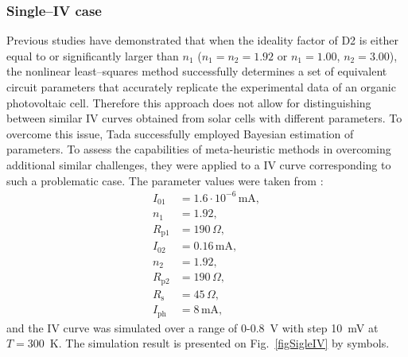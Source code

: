\documentclass[a4paper,fleqn]{cas-dc}
\begin{document}
\subsubsection{Single--IV case}\label{SingleIV}

Previous studies have demonstrated \cite{Tada2015Organic,Tada2021} that when the ideality factor of D2 is either equal to or significantly larger than $n_1$
($n_1=n_2=1.92$ or $n_1=1.00$, $n_2=3.00$), the nonlinear least--squares method successfully determines a set of equivalent circuit parameters
that accurately replicate the experimental data of an organic photovoltaic cell.
Therefore this approach does not allow for distinguishing between similar IV curves obtained from solar cells with different parameters.
To overcome this issue, Tada \cite{Tada2021} successfully employed Bayesian estimation of parameters.
To assess the capabilities of meta-heuristic methods in overcoming additional similar challenges,
they were applied to a IV curve corresponding to such a problematic case.
The parameter values were taken from \cite{Tada2021}:
\begin{equation}
\label{eqParSingleIV}
\begin{split}
I_{01}&=1.6\cdot10^{-6}\,\text{mA},\\
n_1&=1.92,\\
R_\mathrm{p1}&=190\,\Omega,\\
I_{02}&=0.16\,\text{mA},\\
n_2&=1.92,\\
R_\mathrm{p2}&=190\,\Omega,\\
R_\mathrm{s}&=45\,\Omega,\\
I_\mathrm{ph}&=8\,\text{mA},
\end{split}
\end{equation}
and the IV curve was simulated over a range of 0-0.8~V with step 10~mV at $T=300$~K.
The simulation result is presented on Fig.~\ref{figSigleIV} by symbols.
\end{document}
